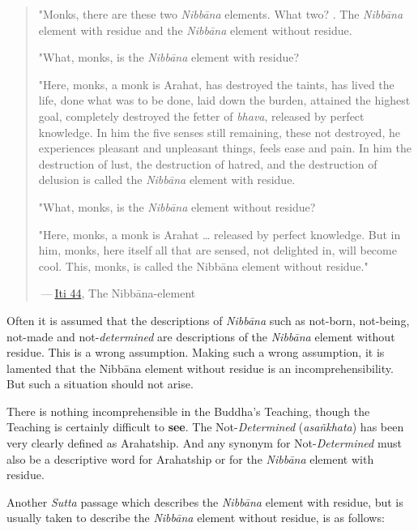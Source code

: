 \begin{quote}
"Monks, there are these two \emph{Nibbāna} elements. What two? . The \emph{Nibbāna} element with residue and the \emph{Nibbāna} element without residue.

"What, monks, is the \emph{Nibbāna} element with residue?

"Here, monks, a monk is Arahat, has destroyed the taints, has lived the life, done what was to be done, laid down the burden, attained the highest goal, completely destroyed the fetter of \emph{bhava}, released by perfect knowledge. In him the five senses still remaining, these not destroyed, he experiences pleasant and unpleasant things, feels ease and pain. In him the destruction of lust, the destruction of hatred, and the destruction of delusion is called the \emph{Nibbāna} element with residue.

"What, monks, is the \emph{Nibbāna} element without residue?

"Here, monks, a monk is Arahat \ldots\hspace{0pt} released by perfect knowledge. But in him, monks, here itself all that are sensed, not delighted in, will become cool. This, monks, is called the Nibbāna element without residue."

 --- \href{https://suttacentral.net/iti44/en/ireland}{Iti 44}, The Nibbāna-element
\end{quote}

Often it is assumed that the descriptions of \emph{Nibbāna} such as not-born, not-being, not-made and not-\emph{determined} are descriptions of the \emph{Nibbāna} element without residue. This is a wrong assumption. Making such a wrong assumption, it is lamented that the Nibbāna element without residue is an incomprehensibility. But such a situation should not arise.

There is nothing incomprehensible in the Buddha's Teaching, though the Teaching is certainly difficult to \textbf{see}. The Not-\emph{Determined} (\emph{asañkhata}) has been very clearly defined as Arahatship. And any synonym for Not-\emph{Determined} must also be a descriptive word for Arahatship or for the \emph{Nibbāna} element with residue.

Another \emph{Sutta} passage which describes the \emph{Nibbāna} element with residue, but is usually taken to describe the \emph{Nibbāna} element without residue, is as follows:

